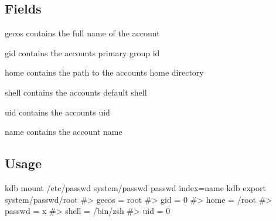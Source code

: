 \subsection*{Fields}


\begin{DoxyItemize}
\item {\ttfamily gecos} contains the full name of the account
\item {\ttfamily gid} contains the accounts primary group id
\item {\ttfamily home} contains the path to the accounts home directory
\item {\ttfamily shell} contains the accounts default shell
\item {\ttfamily uid} contains the accounts uid
\item {\ttfamily name} contains the account name
\end{DoxyItemize}

\subsection*{Usage}


\begin{DoxyCode}
kdb mount /etc/passwd system/passwd passwd index=name
kdb export system/passwd/root
#> gecos = root
#> gid = 0
#> home = /root
#> passwd = x
#> shell = /bin/zsh
#> uid = 0
\end{DoxyCode}
 